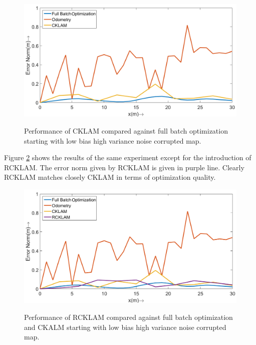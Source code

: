   
\begin{figure}
  \centering
    \includegraphics[width=1.00\textwidth]{images/Syn31_error_plot_CKLAM.png}
  \label{fig:Syn31ErrorPlotCKLAM}
  \caption{Performance of CKLAM compared against full batch optimization starting with low bias high variance noise corrupted map.}
\end{figure}
  
  
  Figure \ref{fig:Syn31ErrorPlot} shows the results of the same experiment except for the introduction of RCKLAM. The error norm given by RCKLAM is given in purple line. Clearly RCKLAM matches closely CKLAM in terms of optimization quality.
    
  \begin{figure}
    \centering
      \includegraphics[width=1.00\textwidth]{images/Syn31_error_plot.png}
    \label{fig:Syn31ErrorPlot}
    \caption{Performance of RCKLAM compared against full batch optimization and CKALM starting with low bias high variance noise corrupted map.}
  \end{figure}
  
